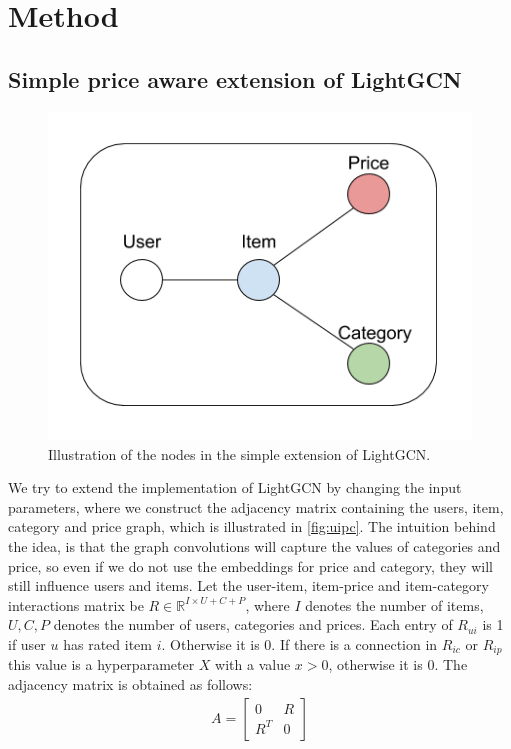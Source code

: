 \section{Method}




\subsection{Simple price aware extension of LightGCN}\label{subsec:simple-extension}
\begin{figure}
    \centering
    \includegraphics[scale=0.5]{figures/uipc.png}
    \caption{Illustration of the nodes in the simple extension of LightGCN.}   
    \label{fig:uipc}
\end{figure}
We try to extend the implementation of LightGCN by changing the input parameters, where we construct the adjacency matrix containing the users, item, category and price graph, which is illustrated in \autoref{fig:uipc}.
The intuition behind the idea, is that the graph convolutions will capture the values of categories and price, so even if we do not use the embeddings for price and category, they will still influence users and items.
Let the user-item, item-price and item-category interactions matrix be $R \in \mathbb{R}^{I \times U + C + P}$, where $I$ denotes the number of items, $U, C, P$ denotes the number of users, categories and prices.
Each entry of $R_{ui}$ is 1 if user $u$ has rated item $i$. Otherwise it is 0.
If there is a connection in $R_{ic}$ or $R_{ip}$ this value is a hyperparameter $X$ with a value $x>0$, otherwise it is 0. 
The adjacency matrix is obtained as follows:
\begin{gather}
    A = 
    \begin{bmatrix}
        0 & R \\
        R^T & 0
    \end{bmatrix}
\end{gather}
